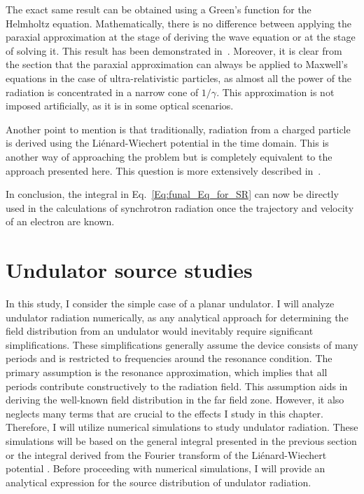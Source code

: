     The exact same result can be obtained using a Green’s function for the Helmholtz equation. Mathematically, there is no difference between applying the paraxial approximation at the stage of deriving the wave equation or at the stage of solving it. This result has been demonstrated in~\cite{geloni_paraxial_2005}. Moreover, it is clear from the section that the paraxial approximation can always be applied to Maxwell’s equations in the case of ultra-relativistic particles, as almost all the power of the radiation is concentrated in a narrow cone of $1/\gamma$. This approximation is not imposed artificially, as it is in some optical scenarios.

    Another point to mention is that traditionally, radiation from a charged particle is derived using the Liénard-Wiechert potential in the time domain. This is another way of approaching the problem but is completely equivalent to the approach presented here. This question is more extensively described in~\cite{geloni_paraxial_2005}.
    
    In conclusion, the integral in Eq.~\ref{Eq:funal_Eq_for_SR} can now be directly used in the calculations of synchrotron radiation once the trajectory and velocity of an electron are known.

    
\section{Undulator source studies}
    In this study, I consider the simple case of a planar undulator. I will analyze undulator radiation numerically, as any analytical approach for determining the field distribution from an undulator would inevitably require significant simplifications. These simplifications generally assume the device consists of many periods and is restricted to frequencies around the resonance condition. The primary assumption is the resonance approximation, which implies that all periods contribute constructively to the radiation field. This assumption aids in deriving the well-known field distribution in the far field zone. However, it also neglects many terms that are crucial to the effects I study in this chapter. Therefore, I will utilize numerical simulations to study undulator radiation. These simulations will be based on the general integral presented in the previous section or the integral derived from the Fourier transform of the Liénard-Wiechert potential \cite{chubar_accurate_1998, tanaka_spectra_2001, tomin_synchrotron_2019}. Before proceeding with numerical simulations, I will provide an analytical expression for the source distribution of undulator radiation. 

